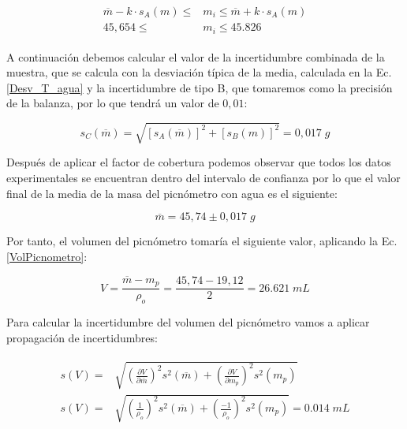 \documentclass[a4paper,12pt,titlepage]{article}
\begin{document}
\begin{align}
    \begin{split}
        \overline{m} - k \cdot s_{A}(m) \leq &m_{i} \leq \overline{m} + k \cdot s_{A}(m) \\
        45,654 \leq &m_{i} \leq 45.826
    \end{split}
\end{align}

A continuación debemos calcular el valor de la incertidumbre combinada de la muestra, que se calcula con la desviación típica de la media, calculada en la Ec.\ref{Desv_T_agua} y la incertidumbre de tipo B, que tomaremos como la precisión de la balanza, por lo que tendrá un valor de $0,01$:

\begin{equation}
    s_{C}(\overline{m}) = \sqrt{[s_{A}(\overline{m})]^2+[s_{B}(m)]^2} = 0,017 \; g
    \label{Inc combinada}
\end{equation}

Después de aplicar el factor de cobertura podemos observar que todos los datos experimentales se encuentran dentro del intervalo de confianza por lo que el valor final de la media de la masa del picnómetro con agua es el siguiente:

\begin{equation}
    \overline{m} = 45,74 \pm 0,017 \; g
\end{equation}

Por tanto, el volumen del picnómetro tomaría el siguiente valor, aplicando la Ec.\ref{VolPicnometro}:

\begin{equation}
    V = \frac{\overline{m}-m_{p}}{\rho_{o}} = \frac{45,74-19,12}{2} = 26.621\; mL
\end{equation}

Para calcular la incertidumbre del volumen del picnómetro vamos a aplicar propagación de incertidumbres:

\begin{align}
    \begin{split}
    s(V) = &\sqrt{\left (\frac{\partial V}{\partial \overline{m}}\right )^2 s^2(\overline{m})  + \left (\frac{\partial V}{\partial m_{p}}\right )^2 s^2(m_{p})} \\
    s(V) = &\sqrt{\left (\frac{1}{\rho_{o}}\right )^2 s^2(\overline{m})  + \left (\frac{-1}{\rho_{o}}\right )^2 s^2(m_{p})} = 0.014 \; mL
    \end{split}
\end{align}
\end{document}
